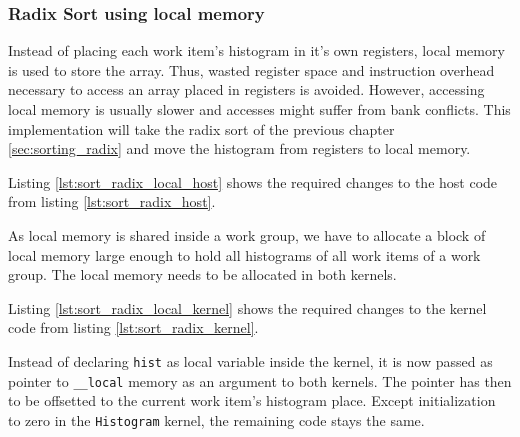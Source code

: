 \subsubsection{Radix Sort using local memory}
\label{sec:sorting_radix_local}

Instead of placing each work item's histogram in it's own registers, local memory is used to store the array. Thus, wasted register space and instruction overhead necessary to access an array placed in registers is avoided. However, accessing local memory is usually slower and accesses might suffer from bank conflicts. This implementation will take the radix sort of the previous chapter \ref{sec:sorting_radix} and move the histogram from registers to local memory.

Listing \ref{lst:sort_radix_local_host} shows the required changes to the host code from listing \ref{lst:sort_radix_host}.



\pagebreak

As local memory is shared inside a work group, we have to allocate a block of local memory large enough to hold all histograms of all work items of a work group. The local memory needs to be allocated in both kernels.

Listing \ref{lst:sort_radix_local_kernel} shows the required changes to the kernel code from listing \ref{lst:sort_radix_kernel}.



Instead of declaring \lstinline!hist! as local variable inside the kernel, it is now passed as pointer to \lstinline!__local! memory as an argument to both kernels. The pointer has then to be offsetted to the current work item's histogram place. Except initialization to zero in the \lstinline!Histogram! kernel, the remaining code stays the same.

